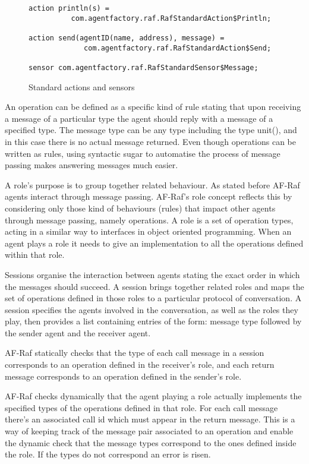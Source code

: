 \documentclass[a4paper,12pt,oneside,fleqn]{book} %
\theoremstyle{plain}
\theoremstyle{definition}
\theoremstyle{remark}
\begin{document}
\begin{figure}\footnotesize %
\begin{verbatim}
action println(s) = 
          com.agentfactory.raf.RafStandardAction$Println;

action send(agentID(name, address), message) = 
             com.agentfactory.raf.RafStandardAction$Send;

sensor com.agentfactory.raf.RafStandardSensor$Message;
\end{verbatim}
\caption{Standard actions and sensors}
\label{fig:actions-sensors}
\end{figure} %


An operation can be defined as a specific kind of rule stating that upon
receiving a message of a particular type the agent should reply with a
message of a specified type. The message type can be any type including the
type unit(), and in this case there is no actual message returned. Even
though operations can be written as rules, using syntactic sugar to
automatise the process of message passing makes answering messages much
easier.

A role's purpose is to group together related behaviour. As stated before
AF-Raf agents interact through message passing. AF-Raf's role concept
reflects this by considering only those kind of behaviours (rules) that
impact other agents through message passing, namely operations. A role is a
set of operation types, acting in a similar way to interfaces in object
oriented programming. When an agent plays a role it needs to give an
implementation to all the operations defined within that role.

Sessions organise the interaction between agents stating the exact order in
which the messages should succeed. A session brings together related roles
and maps the set of operations defined in those roles to a particular
protocol of conversation. A session specifies the agents involved in the
conversation, as well as the roles they play, then provides a list
containing entries of the form: message type followed by the sender agent
and the receiver agent.

AF-Raf statically checks that the type of each call message in a session
corresponds to an operation defined in the receiver's role, and each return
message corresponds to an operation defined in the sender's role.

AF-Raf checks dynamically that the agent playing a role actually implements
the specified types of the operations defined in that role.  For each call
message there's an associated call id which must appear in the return
message. This is a way of keeping track of the message pair associated to
an operation and enable the dynamic check that the message types correspond
to the ones defined inside the role. If the types do not correspond an
error is risen.
\end{document}
